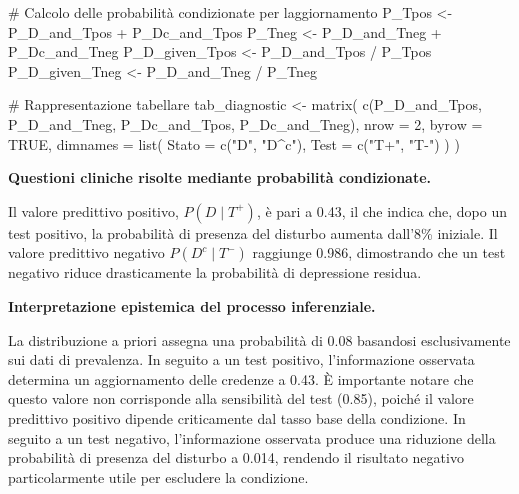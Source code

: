 \documentclass[
  letterpaper,
  DIV=11,
  numbers=noendperiod,
  oneside]{scrreprt}
\newenvironment{Shaded}{\begin{snugshade}}{\end{snugshade}}
\newcommand{\AttributeTok}[1]{\textcolor[rgb]{0.40,0.45,0.13}{#1}}
\newcommand{\CommentTok}[1]{\textcolor[rgb]{0.37,0.37,0.37}{#1}}
\newcommand{\ConstantTok}[1]{\textcolor[rgb]{0.56,0.35,0.01}{#1}}
\newcommand{\DecValTok}[1]{\textcolor[rgb]{0.68,0.00,0.00}{#1}}
\newcommand{\FunctionTok}[1]{\textcolor[rgb]{0.28,0.35,0.67}{#1}}
\newcommand{\NormalTok}[1]{\textcolor[rgb]{0.00,0.23,0.31}{#1}}
\newcommand{\OtherTok}[1]{\textcolor[rgb]{0.00,0.23,0.31}{#1}}
\newcommand{\SpecialCharTok}[1]{\textcolor[rgb]{0.37,0.37,0.37}{#1}}
\newcommand{\StringTok}[1]{\textcolor[rgb]{0.13,0.47,0.30}{#1}}
\theoremstyle{definition}
\theoremstyle{plain}
\theoremstyle{definition}
\theoremstyle{remark}
\begin{document}
\begin{tcolorbox}
\begin{Shaded}
\begin{Highlighting}[]
\CommentTok{\# Calcolo delle probabilità condizionate per l\textquotesingle{}aggiornamento}
\NormalTok{P\_Tpos }\OtherTok{\textless{}{-}}\NormalTok{ P\_D\_and\_Tpos }\SpecialCharTok{+}\NormalTok{ P\_Dc\_and\_Tpos}
\NormalTok{P\_Tneg }\OtherTok{\textless{}{-}}\NormalTok{ P\_D\_and\_Tneg }\SpecialCharTok{+}\NormalTok{ P\_Dc\_and\_Tneg}
\NormalTok{P\_D\_given\_Tpos }\OtherTok{\textless{}{-}}\NormalTok{ P\_D\_and\_Tpos }\SpecialCharTok{/}\NormalTok{ P\_Tpos}
\NormalTok{P\_D\_given\_Tneg }\OtherTok{\textless{}{-}}\NormalTok{ P\_D\_and\_Tneg }\SpecialCharTok{/}\NormalTok{ P\_Tneg}

\CommentTok{\# Rappresentazione tabellare}
\NormalTok{tab\_diagnostic }\OtherTok{\textless{}{-}} \FunctionTok{matrix}\NormalTok{(}
  \FunctionTok{c}\NormalTok{(P\_D\_and\_Tpos, P\_D\_and\_Tneg,}
\NormalTok{    P\_Dc\_and\_Tpos, P\_Dc\_and\_Tneg),}
  \AttributeTok{nrow =} \DecValTok{2}\NormalTok{, }\AttributeTok{byrow =} \ConstantTok{TRUE}\NormalTok{,}
  \AttributeTok{dimnames =} \FunctionTok{list}\NormalTok{(}
    \AttributeTok{Stato =} \FunctionTok{c}\NormalTok{(}\StringTok{"D"}\NormalTok{, }\StringTok{"D\^{}c"}\NormalTok{),}
    \AttributeTok{Test =} \FunctionTok{c}\NormalTok{(}\StringTok{"T+"}\NormalTok{, }\StringTok{"T{-}"}\NormalTok{)}
\NormalTok{  )}
\NormalTok{)}
\end{Highlighting}
\end{Shaded}

\textbf{Questioni cliniche risolte mediante probabilità condizionate.}

Il valore predittivo positivo, \(P(D \mid T^+)\), è pari a 0.43, il che
indica che, dopo un test positivo, la probabilità di presenza del
disturbo aumenta dall'8\% iniziale. Il valore predittivo negativo
\(P(D^c \mid T^-)\) raggiunge 0.986, dimostrando che un test negativo
riduce drasticamente la probabilità di depressione residua.

\textbf{Interpretazione epistemica del processo inferenziale.}

La distribuzione a priori assegna una probabilità di 0.08 basandosi
esclusivamente sui dati di prevalenza. In seguito a un test positivo,
l'informazione osservata determina un aggiornamento delle credenze a
0.43. È importante notare che questo valore non corrisponde alla
sensibilità del test (0.85), poiché il valore predittivo positivo
dipende criticamente dal tasso base della condizione. In seguito a un
test negativo, l'informazione osservata produce una riduzione della
probabilità di presenza del disturbo a 0.014, rendendo il risultato
negativo particolarmente utile per escludere la condizione.


\end{tcolorbox}
\end{document}
